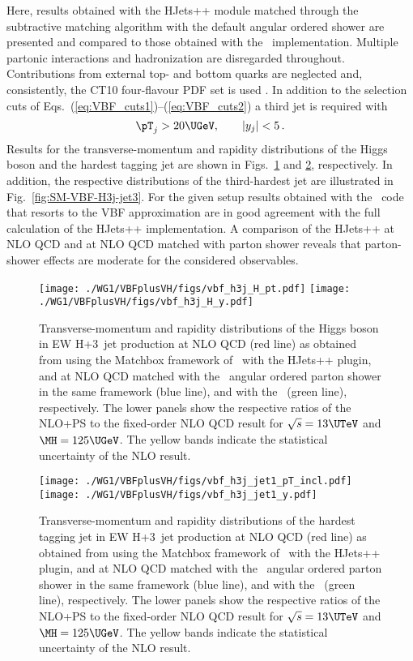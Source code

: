 Here, results obtained with the \textsf{HJets++} module matched  through the subtractive matching algorithm with the default  angular ordered shower are presented and compared to those obtained with the \POWHEGBOX\   implementation. Multiple partonic interactions and hadronization are disregarded throughout. Contributions from external top- and bottom quarks are neglected and, consistently, the CT10 four-flavour PDF set is used \cite{Lai:2010vv}. In addition to the selection cuts of Eqs.~(\ref{eq:VBF_cuts1})--(\ref{eq:VBF_cuts2}) a third jet is required with 
%
\begin{equation}
\label{eq:VBF_jet3_cut}
{\pT}_j > 20\UGeV, \qquad 
|y_j| < 5\,.
\end{equation}
%
Results for the transverse-momentum and rapidity distributions of the Higgs boson and the hardest tagging jet are shown in Figs.~\ref{fig:SM-VBF-H3j-H} and \ref{fig:SM-VBF-H3j-jet1}, respectively. In addition, the respective distributions of the third-hardest jet are illustrated in Fig.~\ref{fig:SM-VBF-H3j-jet3}. 
%
For the given setup results obtained with the \POWHEGBOX\  code that resorts to the VBF approximation are in good agreement with the full calculation of the \textsf{HJets++} implementation. A comparison of the \textsf{HJets++} at NLO QCD  and at NLO QCD matched with parton shower reveals that parton-shower effects are moderate for the considered observables. 
%
\begin{figure}
\texttt{[image: ./WG1/VBFplusVH/figs/vbf\_h3j\_H\_pt.pdf]}
\hfill
\texttt{[image: ./WG1/VBFplusVH/figs/vbf\_h3j\_H\_y.pdf]}
\caption{Transverse-momentum and rapidity distributions of the Higgs boson in EW H+3~jet production at NLO QCD (red line) as obtained from using the \textsf{Matchbox} framework 
of \ with the \textsf{HJets++} plugin, and at NLO QCD matched with the 
\ angular ordered parton shower in the same framework (blue line), 
and with the \POWHEGBOX\ (green line), respectively. The lower panels show the respective ratios of the NLO+PS to the fixed-order NLO QCD result for $\sqrt{s}=13\UTeV$ and $\MH=125\UGeV$. The yellow bands indicate the statistical uncertainty of the NLO result.}
\label{fig:SM-VBF-H3j-H}
\end{figure}
%
\begin{figure}
\texttt{[image: ./WG1/VBFplusVH/figs/vbf\_h3j\_jet1\_pT\_incl.pdf]}
\hfill
\texttt{[image: ./WG1/VBFplusVH/figs/vbf\_h3j\_jet1\_y.pdf]}
\caption{Transverse-momentum and rapidity distributions of the hardest tagging jet in EW H+3~jet production at NLO QCD (red line)  as obtained from using the \textsf{Matchbox} framework 
of \ with the \textsf{HJets++} plugin, and at NLO QCD matched with the 
\ angular ordered parton shower in the same framework (blue line), 
and with the \POWHEGBOX\ (green line), respectively. 
The lower panels show the respective ratios of the NLO+PS to the fixed-order NLO QCD result for $\sqrt{s}=13\UTeV$ and $\MH=125\UGeV$. The yellow bands indicate the statistical uncertainty of the NLO result. }
\label{fig:SM-VBF-H3j-jet1}
\end{figure}
